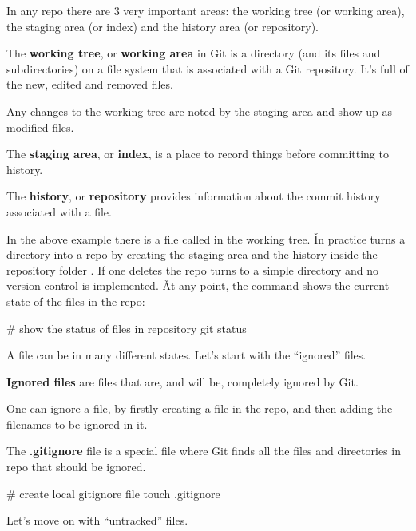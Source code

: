 In any repo there are 3 very important areas: the working tree (or working area), the staging area (or index) and the
history area (or repository).

The \textbf{working tree}, or \textbf{working area} in Git is a directory (and its files and subdirectories) on a
file system that is associated with a Git repository. It's full of the new, edited and removed files.
\ed

Any changes to the working tree are noted by the staging area and show up as modified files.

The \textbf{staging area}, or \textbf{index}, is a place to record things before committing to history.
\ed

The \textbf{history}, or \textbf{repository} provides information about the commit history associated with a file.
\ed


In the above example there is a file called  in the working tree. \v

In practice  turns a directory into a repo by creating the staging area and the history inside the
repository folder . If one deletes  the repo turns to a simple directory and no version control
is implemented. \v

At any point, the  command shows the current state of the files in the repo:

\begin{bash}
# show the status of files in repository
git status
\end{bash}

A file can be in many different states. Let's start with the ``ignored'' files.

\textbf{Ignored files} are files that are, and will be, completely ignored by Git.
\ed

One can ignore a file, by firstly creating a  file in the repo, and then adding the filenames to be
ignored in it.

\bd[.gitignore]
The \textbf{.gitignore} file is a special file where Git finds all the files and directories in repo that should be
ignored.
\ed

\begin{bash}
# create local gitignore file
touch .gitignore
\end{bash}

Let's move on with ``untracked'' files.

